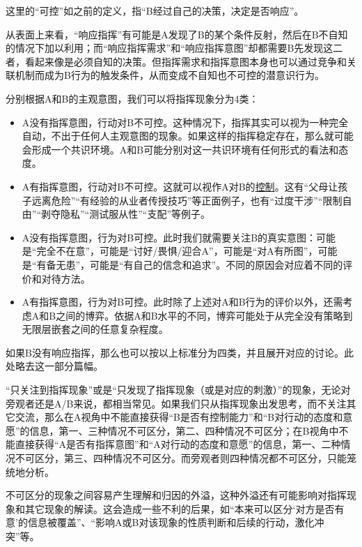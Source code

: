 \begin{explain}
这里的“可控”如之前的定义，指“B经过自己的决策，决定是否响应”。

从表面上来看，“响应指挥”有可能是A发现了B的某个条件反射，然后在B不自知的情况下加以利用；而“响应指挥需求”和“响应指挥意图”却都需要B先发现这二者，看起来像是必须自知的决策。但指挥需求和指挥意图本身也可以通过竞争和关联机制而成为B行为的触发条件，从而变成不自知也不可控的潜意识行为。

分别根据A和B的主观意图，我们可以将指挥现象分为4类：
\begin{itemize}
\item A没有指挥意图，行动对B不可控。这种情况下，指挥其实可以视为一种完全自动，不出于任何人主观意图的现象。如果这样的指挥稳定存在，那么就可能会形成一个共识环境。A和B可能分别对这一共识环境有任何形式的看法和态度。
\item A有指挥意图，行动对B不可控。这就可以视作A对B的\hyperref[def:控制人]{控制}。这有“父母让孩子远离危险”“有经验的从业者传授技巧”等正面例子，也有“过度干涉”“限制自由”“剥夺隐私”“测试服从性”“支配”等例子。
\item A没有指挥意图，行为对B可控。此时我们就需要关注B的真实意图：可能是“完全不在意”，可能是“讨好/畏惧/迎合A”，可能是“对A有所图”，可能是“有备无患”，可能是“有自己的信念和追求”。不同的原因会对应着不同的评价和对待方法。
\item A有指挥意图，行为对B可控。此时除了上述对A和B行为的评价以外，还需考虑A和B之间的博弈。依据A和B水平的不同，博弈可能处于从完全没有策略到无限层嵌套之间的任意复杂程度。
\end{itemize}
如果B没有响应指挥，那么也可以按以上标准分为四类，并且展开对应的讨论。此处略去这一部分篇幅。

“只关注到指挥现象”或是“只发现了指挥现象（或是对应的刺激）”的现象，无论对旁观者还是A/B来说，都相当常见。如果我们只从指挥现象出发思考，而不关注其它交流，那么在A视角中不能直接获得“B是否有控制能力”和“B对行动的态度和意愿”的信息，第一、三种情况不可区分，第二、四种情况不可区分；在B视角中不能直接获得“A是否有指挥意图”和“A对行动的态度和意愿”的信息，第一、二种情况不可区分，第三、四种情况不可区分。而旁观者则四种情况都不可区分，只能笼统地分析。

不可区分的现象之间容易产生理解和归因的外溢，这种外溢还有可能影响对指挥现象和其它现象的解读。这会造成一些不利的后果，如“本来可以区分‘对方是否有意’的信息被覆盖”、“影响A或B对该现象的性质判断和后续的行动，激化冲突”等。
\end{explain}

